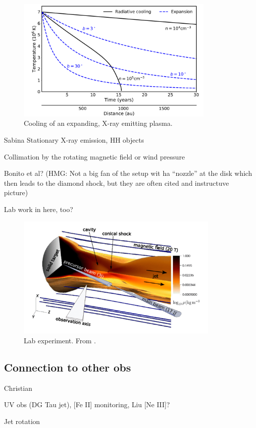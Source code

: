 \begin{figure}[t]
\centering

\includegraphics[height=6cm]{figs/cooling}
\caption{Cooling of an expanding, X-ray emitting plasma. \label{fig:cooling}}
\end{figure}


{\color{blue}Sabina
Stationary X-ray emission, HH objects

Collimation by the rotating magnetic field or wind pressure

Bonito et al? (HMG: Not a big fan of the setup wit ha ``nozzle'' at the disk which then leads to the diamond shock, but they are often cited and instructuve picture)

Lab work in here, too?
}


\begin{figure}[t]
\centering

\includegraphics[height=6cm]{figs/lab}
\caption{Lab experiment. From \citet{PhysRevLett.119.255002}. \label{fig:lab}}
\end{figure}


\subsection{Connection to other obs}
{\color{blue}Christian

UV obs (DG Tau jet), [Fe II] monitoring, Liu [Ne III]?

Jet rotation

}
